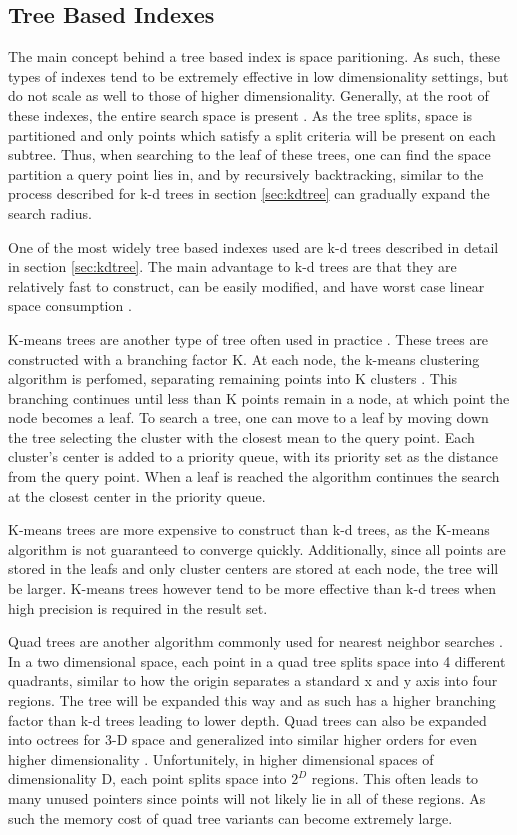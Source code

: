 \subsection{Tree Based Indexes}

The main concept behind a tree based index is space paritioning.  As such, these types of indexes tend to be extremely effective in low dimensionality settings, but do not scale as well to those of higher dimensionality.  Generally, at the root of these indexes, the entire search space is present \citep{yianilos1993data}.  As the tree splits, space is partitioned and only points which satisfy a split criteria will be present on each subtree.  Thus, when searching to the leaf of these trees, one can find the space partition a query point lies in, and by recursively backtracking, similar to the process described for k-d trees in section \ref{sec:kdtree} can gradually expand the search radius.

One of the most widely tree based indexes used are k-d trees described in detail in section \ref{sec:kdtree}.  The main advantage to k-d trees are that they are relatively fast to construct, can be easily modified, and have worst case linear space consumption \citep{yianilos1993data}.

K-means trees are another type of tree often used in practice \citep{flann_pami_2014}.  These trees are constructed with a branching factor K.  At each node, the k-means clustering algorithm is perfomed, separating remaining points into K clusters \citep{hartigan1979algorithm}.  This branching continues until less than K points remain in a node, at which point the node becomes a leaf.  To search a tree, one can move to a leaf by moving down the tree selecting the cluster with the closest mean to the query point.  Each cluster's center is added to a priority queue, with its priority set as the distance from the query point.  When a leaf is reached the algorithm continues the search at the closest center in the priority queue.

K-means trees are more expensive to construct than k-d trees, as the K-means algorithm is not guaranteed to converge quickly.  Additionally, since all points are stored in the leafs and only cluster centers are stored at each node, the tree will be larger.  K-means trees however tend to be more effective than k-d trees when high precision is required in the result set.

Quad trees are another algorithm commonly used for nearest neighbor searches \citep{finkel1974quad}.  In a two dimensional space, each point in a quad tree splits space into 4 different quadrants, similar to how the origin separates a standard x and y axis into four regions.  The tree will be expanded this way and as such has a higher branching factor than k-d trees leading to lower depth.  Quad trees can also be expanded into octrees for 3-D space and generalized into similar higher orders for even higher dimensionality \citep{samet1988overview}.  Unfortunitely, in higher dimensional spaces of dimensionality D, each point splits space into $2^D$ regions.  This often leads to many unused pointers since points will not likely lie in all of these regions.  As such the memory cost of quad tree variants can become extremely large.

